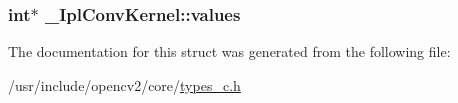 \hypertarget{struct__IplConvKernel_a164bc3bc4ec7c6a79419680567f2a0bc}{
\subsubsection[{values}]{\setlength{\rightskip}{0pt plus 5cm}int$\ast$ \-\_\-\-Ipl\-Conv\-Kernel\-::values}}\label{struct__IplConvKernel_a164bc3bc4ec7c6a79419680567f2a0bc}


The documentation for this struct was generated from the following file\-:\begin{DoxyCompactItemize}
\item 
/usr/include/opencv2/core/\hyperlink{core_2types__c_8h}{types\-\_\-c.\-h}\end{DoxyCompactItemize}
